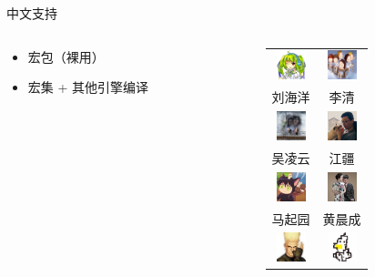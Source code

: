 \begin{frame}{中文支持}
\begin{columns}
\begin{column}{0.66\textwidth}
\begin{itemize}
      \begin{itemize}
        \item {} 宏包（裸用）
        \item {} 宏集 + 其他引擎编译
      \end{itemize}
  \end{itemize}
\end{column} \pause
\begin{column}{0.32\textwidth}
  \tiny
  \begin{tabular}{cc}
    \includegraphics[width=24pt]{images/leoliu.png}        &
    \includegraphics[width=24pt]{images/qinglee.jpg}       \\
    刘海洋 & 李清 \\[2ex]
    \includegraphics[width=24pt]{images/wulingyun.jpg}     &
    \includegraphics[width=24pt]{images/jjgod.jpg}         \\
    吴凌云 & 江疆 \\[2ex]
    \includegraphics[width=24pt]{images/li-a-ling.jpg}     &
    \includegraphics[width=24pt]{images/liam-huang.jpg}    \\
    马起园 & 黄晨成 \\[2ex]
    \includegraphics[width=24pt]{images/louisstuart96.jpg} &
    \includegraphics[width=24pt]{images/zepinglee.jpg}     \\

\end{tabular}
\end{column}
\end{columns}
\end{frame}
